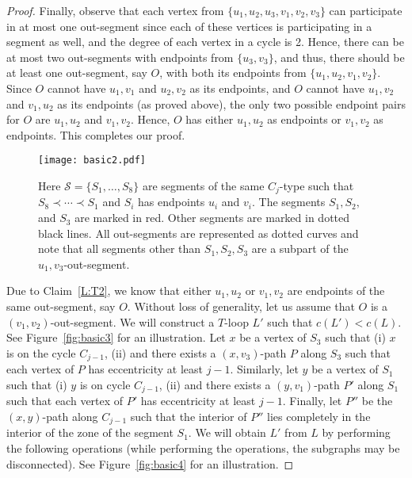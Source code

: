 \documentclass{article}
\numberwithin{claimcounter}{lemma}
\newenvironment{proofofclaim}{\renewcommand{\qed}{\hfill $\diamond$}
  \renewcommand{\proofname}{Proof of Claim}\proof}{\endproof}
\begin{document}
\begin{proof}
\begin{proofofclaim}
     Finally, observe that each vertex from $\{u_1,u_2,u_3,v_1,v_2,v_3\}$ can participate in at most one out-segment since each of these vertices is participating in a segment as well, and the degree of each vertex in a cycle is 2. Hence, there can be at most two out-segments with endpoints from $\{u_3,v_3\}$, and thus, there should be at least one out-segment, say $O$, with both its endpoints from $\{u_1,u_2,v_1,v_2\}$. Since $O$ cannot have $u_1,v_1$ and $u_2,v_2$ as its endpoints, and $O$ cannot have $u_1,v_2$ and $v_1,u_2$ as its endpoints (as proved above), the only two possible endpoint pairs  for $O$ are $u_1,u_2$ and $v_1,v_2$. Hence, $O$ has either  $u_1,u_2$ as endpoints or $v_1,v_2$ as endpoints. This completes our proof.   
\end{proofofclaim}























\begin{figure}
    \centering
    \texttt{[image: basic2.pdf]}
    \caption{Here $\mathcal{S} = \{S_1,\ldots,S_8\}$ are segments of the same $C_j$-type such that $S_8\prec \cdots \prec S_1$ and $S_i$ has endpoints $u_i$ and $v_i$. The segments $S_1,S_2,$ and $S_3$ are marked in red. Other segments are marked in dotted black lines. All out-segments  are represented as dotted curves and note that all segments other than $S_1,S_2,S_3$ are a subpart of the $u_1,v_3$-out-segment.} 
    \label{fig:basic2}
\end{figure}







Due to Claim~\ref{L:T2}, we know that either $u_1,u_2$  or $v_1,v_2$ are endpoints of the same out-segment, say $O$. Without loss of generality, let us assume that $O$ is a $(v_1,v_2)$-out-segment.  We will construct a $T$-loop $L'$ such that $c(L')<c(L)$. See Figure~\ref{fig:basic3} for an illustration. Let $x$ be a vertex of $S_3$ such that (i) $x$ is on the cycle $C_{j-1}$, (ii) and there exists a $(x,v_3)$-path $P$  along $S_3$ such that each vertex of $P$ has eccentricity at least $j-1$. Similarly, let $y$ be a vertex of $S_1$ such that (i) $y$ is on cycle $C_{j-1}$, (ii) and there exists a $(y,v_1)$-path $P'$  along $S_1$ such that each vertex of $P'$ has eccentricity at least $j-1$. Finally, let $P''$ be the $(x,y)$-path along $C_{j-1}$ such that the interior of $P''$ lies completely in the interior of the zone of the segment $S_1$. We will obtain $L'$ from $L$ by performing the following operations (while performing the operations, the subgraphs may be disconnected). See Figure~\ref{fig:basic4} for an illustration.


\end{proof}
\end{document}
